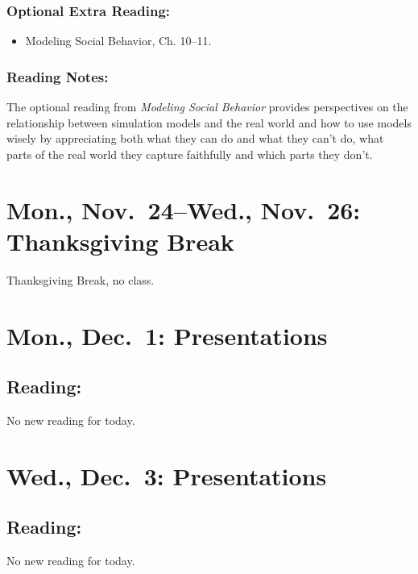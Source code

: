 \documentclass[
]{article}
\providecommand{\tightlist}{%
  \setlength{\itemsep}{0pt}\setlength{\parskip}{0pt}}
\begin{document}
\subsubsection{Optional Extra Reading:}\label{optional-extra-reading-5}

\begin{itemize}
\tightlist
\item
  Modeling Social Behavior, Ch. 10--11.
\end{itemize}

\subsubsection{Reading Notes:}\label{reading-notes-17}

The optional reading from \emph{Modeling Social Behavior} provides
perspectives on the relationship between simulation models and the real
world and how to use models wisely by appreciating both what they can do
and what they can't do, what parts of the real world they capture
faithfully and which parts they don't.

\section{Mon., Nov.~24--Wed., Nov.~26: Thanksgiving
Break}\label{mon.-nov.-24wed.-nov.-26-thanksgiving-break}

Thanksgiving Break, no class.

\section{Mon., Dec.~1: Presentations}\label{mon.-dec.-1-presentations}

\subsection{Reading:}\label{reading-26}

No new reading for today.

\section{Wed., Dec.~3: Presentations}\label{wed.-dec.-3-presentations}

\subsection{Reading:}\label{reading-27}

No new reading for today.
\end{document}
